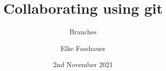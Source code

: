 \documentclass[xcolor=dvipsnames]{beamer}
\begin{document}
 

\title[]
{Collaborating using git}
\subtitle{Branches}
\author[E. Fasshauer]{Elke Fasshauer}
\date[2.11.21]{2nd November 2021}


\begin{frame}
\titlepage
\end{frame}




%






%
\end{document}
